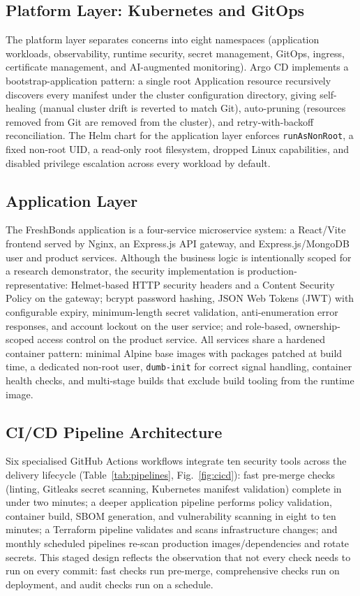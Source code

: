 \documentclass[conference]{IEEEtran}
\begin{document}
\subsection{Platform Layer: Kubernetes and GitOps}
The platform layer separates concerns into eight namespaces (application workloads, observability, runtime security, secret management, GitOps, ingress, certificate management, and AI-augmented monitoring). Argo CD implements a bootstrap-application pattern: a single root Application resource recursively discovers every manifest under the cluster configuration directory, giving self-healing (manual cluster drift is reverted to match Git), auto-pruning (resources removed from Git are removed from the cluster), and retry-with-backoff reconciliation. The Helm chart for the application layer enforces \texttt{runAsNonRoot}, a fixed non-root UID, a read-only root filesystem, dropped Linux capabilities, and disabled privilege escalation across every workload by default.

\subsection{Application Layer}
The FreshBonds application is a four-service microservice system: a React/Vite frontend served by Nginx, an Express.js API gateway, and Express.js/MongoDB user and product services. Although the business logic is intentionally scoped for a research demonstrator, the security implementation is production-representative: Helmet-based HTTP security headers and a Content Security Policy on the gateway; bcrypt password hashing, JSON Web Tokens (JWT) with configurable expiry, minimum-length secret validation, anti-enumeration error responses, and account lockout on the user service; and role-based, ownership-scoped access control on the product service. All services share a hardened container pattern: minimal Alpine base images with packages patched at build time, a dedicated non-root user, \texttt{dumb-init} for correct signal handling, container health checks, and multi-stage builds that exclude build tooling from the runtime image.

\subsection{CI/CD Pipeline Architecture}
Six specialised GitHub Actions workflows integrate ten security tools across the delivery lifecycle (Table~\ref{tab:pipelines}, Fig.~\ref{fig:cicd}): fast pre-merge checks (linting, Gitleaks secret scanning, Kubernetes manifest validation) complete in under two minutes; a deeper application pipeline performs policy validation, container build, SBOM generation, and vulnerability scanning in eight to ten minutes; a Terraform pipeline validates and scans infrastructure changes; and monthly scheduled pipelines re-scan production images/dependencies and rotate secrets. This staged design reflects the observation that not every check needs to run on every commit: fast checks run pre-merge, comprehensive checks run on deployment, and audit checks run on a schedule.
\end{document}
